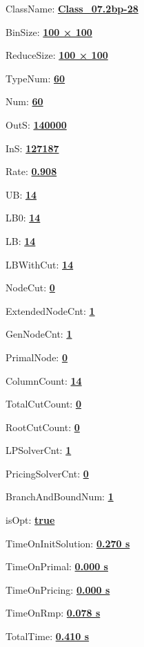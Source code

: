 \documentclass[11pt]{article}
\begin{document}
\pagestyle{empty}


ClassName: \underline{\textbf{Class_07.2bp-28}}
\par
BinSize: \underline{\textbf{100 × 100}}
\par
ReduceSize: \underline{\textbf{100 × 100}}
\par
TypeNum: \underline{\textbf{60}}
\par
Num: \underline{\textbf{60}}
\par
OutS: \underline{\textbf{140000}}
\par
InS: \underline{\textbf{127187}}
\par
Rate: \underline{\textbf{0.908}}
\par
UB: \underline{\textbf{14}}
\par
LB0: \underline{\textbf{14}}
\par
LB: \underline{\textbf{14}}
\par
LBWithCut: \underline{\textbf{14}}
\par
NodeCut: \underline{\textbf{0}}
\par
ExtendedNodeCnt: \underline{\textbf{1}}
\par
GenNodeCnt: \underline{\textbf{1}}
\par
PrimalNode: \underline{\textbf{0}}
\par
ColumnCount: \underline{\textbf{14}}
\par
TotalCutCount: \underline{\textbf{0}}
\par
RootCutCount: \underline{\textbf{0}}
\par
LPSolverCnt: \underline{\textbf{1}}
\par
PricingSolverCnt: \underline{\textbf{0}}
\par
BranchAndBoundNum: \underline{\textbf{1}}
\par
isOpt: \underline{\textbf{true}}
\par
TimeOnInitSolution: \underline{\textbf{0.270 s}}
\par
TimeOnPrimal: \underline{\textbf{0.000 s}}
\par
TimeOnPricing: \underline{\textbf{0.000 s}}
\par
TimeOnRmp: \underline{\textbf{0.078 s}}
\par
TotalTime: \underline{\textbf{0.410 s}}
\par
\newpage


\end{document}
